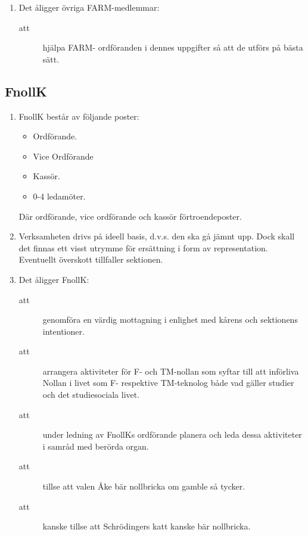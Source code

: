 \documentclass[11pt,a4paper]{article}
\begin{document}
\begin{enumerate}[\thesubsection .1]
  \item Det åligger övriga FARM-medlemmar:
    \begin{description}
      \item[att] hjälpa FARM- ordföranden i dennes uppgifter så att de utförs på bästa sätt.
    \end{description}

\end{enumerate}


\subsection{FnollK}

\begin{enumerate}[\thesubsection .1]

  \item FnollK består av följande poster:
    \begin{itemize}
      \item Ordförande.
      \item Vice Ordförande
      \item Kassör.
      \item 0-4 ledamöter.
    \end{itemize}

  Där ordförande, vice ordförande och  kassör förtroendeposter.
  

  \item Verksamheten drivs på ideell basis, d.v.s. den ska gå jämnt
  upp. Dock skall det finnas ett visst utrymme för ersättning i form
  av representation. Eventuellt överskott tillfaller sektionen. 

  \item Det åligger FnollK:
    \begin{description}
      \item[att] genomföra en värdig mottagning i enlighet med kårens och sektionens intentioner.
      \item[att] arrangera aktiviteter för F- och TM-nollan som syftar till
      att införliva Nollan i livet som F- respektive TM-teknolog både vad gäller
      studier och det studiesociala livet.
      \item[att] under ledning av FnollKs  ordförande planera och leda dessa aktiviteter i samråd med berörda organ.
      \item[att] tillse att valen Åke bär nollbricka om gamble så
      tycker.
      \item[att] kanske tillse att Schrödingers katt kanske bär nollbricka.
    \end{description}


\end{enumerate}
\end{document}
